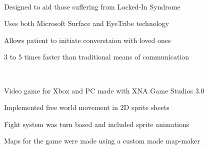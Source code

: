 \documentclass[]{deedy-resume-openfont}
\begin{document}
\begin{minipage}[t]{0.66\textwidth}
\href{https://www.youtube.com/watch?v=mYUiSeqqgDY&list=PLbbCsk7MUIGfXpnd9XN-pBeCd6ixuCQ2X}{} \\
\begin{tightemize}
\item Designed to aid those suffering from Locked-In Syndrome
\item Uses both Microsoft Surface and EyeTribe technology
\item Allows patient to initiate converstaion with loved ones
\item 3 to 5 times faster than traditional means of communication
\end{tightemize}
\sectionsep

\href{https://github.com/jonwho/ScottTheIntern}{} \\
\begin{tightemize}
\item Video game for Xbox and PC made with XNA Game Studios 3.0
\item Implemented free world movement in 2D sprite sheets
\item Fight system was turn based and included sprite animations
\item Maps for the game were made using a custom made map-maker
\end{tightemize}
\sectionsep


\end{minipage} 
\end{document}
